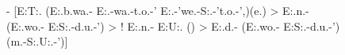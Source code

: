 \documentclass{article}%
\begin{document}
\begin{figure}
\begin{tabular}{|llll|}
\end{tabular}
\caption{\textbf{} - \small{[E:T:. (E:.b.wa.- E:.-wa.-t.o.-' E:.-'we.-S:.-'t.o.-',)(e.) > E:.n.- (E:.wo.- E:S:.-d.u.-') > ! E:.n.- E:U:. () > E:.d.- (E:.wo.- E:S:.-d.u.-')(m.-S:.U:.-')]}}
\label{fig:word_ieml}
\end{figure}
%
\normalsize%
\end{document}
